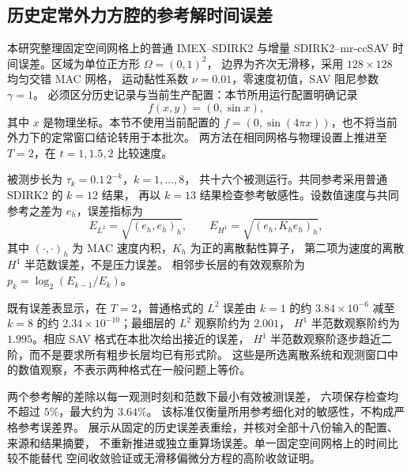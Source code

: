 \subsection{历史定常外力方腔的参考解时间误差}

本研究整理固定空间网格上的普通 IMEX--SDIRK2 与增量
SDIRK2--mr-ccSAV 时间误差。区域为单位正方形 $\Omega=(0,1)^2$，
边界为齐次无滑移，采用 $128\times128$ 均匀交错 MAC 网格，
运动黏性系数 $\nu=0.01$，零速度初值，SAV 阻尼参数 $\gamma=1$。
必须区分历史记录与当前生产配置：本节所用运行配置明确记录
\begin{equation}
 f(x,y)=(0,\sin x),
\end{equation}
其中 $x$ 是物理坐标。本节不使用当前配置的
$f=(0,\sin(4\pi x))$，也不将当前外力下的定常窗口结论转用于本批次。
两方法在相同网格与物理设置上推进至 $T=2$，在 $t=1,1.5,2$ 比较速度。

被测步长为 $\tau_k=0.1\,2^{-k}$，$k=1,\ldots,8$，
共十六个被测运行。共同参考采用普通 SDIRK2 的 $k=12$ 结果，
再以 $k=13$ 结果检查参考敏感性。设数值速度与共同参考之差为
$e_h$，误差指标为
\begin{equation}
 E_{L^2}=\sqrt{(e_h,e_h)_h},\qquad
 E_{H^1}=\sqrt{(e_h,K_he_h)_h},
\end{equation}
其中 $(\cdot,\cdot)_h$ 为 MAC 速度内积，$K_h$ 为正的离散黏性算子，
第二项为速度的离散 $H^1$ 半范数误差，不是压力误差。
相邻步长层的有效观察阶为 $p_k=\log_2(E_{k-1}/E_k)$。

既有误差表显示，在 $T=2$，普通格式的 $L^2$ 误差由
$k=1$ 的约 $3.84\times10^{-6}$ 减至 $k=8$ 的约
$2.34\times10^{-10}$；最细层的 $L^2$ 观察阶约为 $2.001$，
$H^1$ 半范数观察阶约为 $1.995$。相应 SAV 格式在本批次给出接近的误差，
$H^1$ 半范数观察阶逐步趋近二阶，而不是要求所有粗步长层均已有形式阶。
这些是所选离散系统和观测窗口中的数值观察，不表示两种格式在一般问题上等价。

两个参考解的差除以每一观测时刻和范数下最小有效被测误差，
六项保存检查均不超过 $5\%$，最大约为 $3.64\%$。
该标准仅衡量所用参考细化对的敏感性，不构成严格参考误差界。
展示从固定的历史误差表重绘，并核对全部十八份输入的配置、来源和结果摘要，
不重新推进或独立重算场误差。单一固定空间网格上的时间比较不能替代
空间收敛验证或无滑移偏微分方程的高阶收敛证明。

